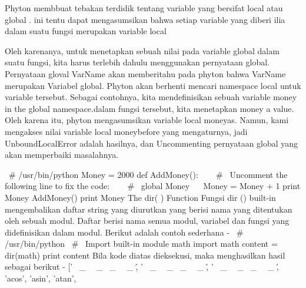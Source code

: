 Phyton membbuat tebakan terdidik tentang variable yang bersifat local atau global . ini tentu dapat mengasumsikan bahwa setiap variable yang diberi ilia dalam suatu fungsi merupakan variable local

Oleh karenanya, untuk menetapkan sebuah nilai pada variable global dalam suatu fungsi, kita harus terlebih dahulu menggunakan pernyataan global. Pernyataan gloval VarName akan memberitahu pada phyton bahwa VarName merupakan Variabel global. Phyton akan berhenti mencari namespace local untuk variable tersebut.
Sebagai contohnya, kita mendefinisikan sebuah variable money in the global namespace.dalam fungsi tersebut, kita menetapkan money a value. Oleh karena itu, phyton mengasumsikan variable local moneyas. Namun, kami mengakses nilai variable local moneybefore yang mengaturnya, jadi UnboundLocalError adalah hasilnya, dan Uncommenting pernyataan global yang akan memperbaiki masalahnya.
 
 \hspace*{0.5in}  \  \#  \!/usr/bin/python  
 \hspace*{0.5in} Money = 2000  
 \hspace*{0.5in} def AddMoney():  
 \hspace*{0.5in} ~~  \  \#  \ Uncomment the following line to fix the code:  
 \hspace*{0.5in} ~~  \  \#  \ global Money  
 \hspace*{0.5in} ~~ Money = Money + 1  
 \hspace*{0.5in} print Money  
 \hspace*{0.5in} AddMoney() 
 \hspace*{0.5in} print Money  
The dir( ) Function  
Fungsi dir () built-in mengembalikan daftar string yang diurutkan yang berisi nama yang ditentukan oleh sebuah modul. 
Daftar berisi nama semua modul, variabel dan fungsi yang didefinisikan dalam modul. Berikut adalah contoh sederhana - 
 \hspace*{0.5in}  \  \#  \!/usr/bin/python 
 \hspace*{0.5in}  \  \#  \ Import built-in module math  
 \hspace*{0.5in} import math  
 \hspace*{0.5in} content = dir(math) 
 \hspace*{0.5in} print content 
Bila kode diatas dieksekusi, maka menghasilkan hasil sebagai berikut - 
 \hspace*{0.5in} [' \  \_  \ \  \_  \doc \  \_  \ \  \_  \', ' \  \_  \ \  \_  \file \  \_  \ \  \_  \', ' \  \_  \ \  \_  \name \  \_  \ \  \_  \', 'acos', 'asin', 'atan',
 
